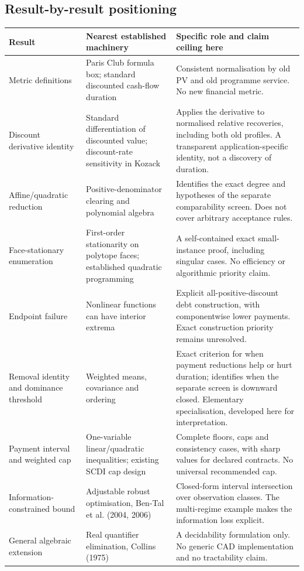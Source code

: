 \documentclass[11pt,a4paper]{article}
\begin{document}
\subsection{Result-by-result positioning}
\small
\begin{longtable}{p{}p{}p{}}
\toprule Result & Nearest established machinery & Specific role and claim ceiling here\\\midrule\endhead
Metric definitions & Paris Club formula box; standard discounted cash-flow duration & Consistent normalisation by old PV and old programme service. No new financial metric.\\
Discount derivative identity & Standard differentiation of discounted value; discount-rate sensitivity in Kozack & Applies the derivative to normalised relative recoveries, including both old profiles. A transparent application-specific identity, not a discovery of duration.\\
Affine/quadratic reduction & Positive-denominator clearing and polynomial algebra & Identifies the exact degree and hypotheses of the separate comparability screen. Does not cover arbitrary acceptance rules.\\
Face-stationary enumeration & First-order stationarity on polytope faces; established quadratic programming & A self-contained exact small-instance proof, including singular cases. No efficiency or algorithmic priority claim.\\
Endpoint failure & Nonlinear functions can have interior extrema & Explicit all-positive-discount debt construction, with componentwise lower payments. Exact construction priority remains unresolved.\\
Removal identity and dominance threshold & Weighted means, covariance and ordering & Exact criterion for when payment reductions help or hurt duration; identifies when the separate screen is downward closed. Elementary specialisation, developed here for interpretation.\\
Payment interval and weighted cap & One-variable linear/quadratic inequalities; existing SCDI cap design & Complete floors, caps and consistency cases, with sharp values for declared contracts. No universal recommended cap.\\
Information-constrained bound & Adjustable robust optimisation, Ben-Tal et al. (2004, 2006) & Closed-form interval intersection over observation classes. The multi-regime example makes the information loss explicit.\\
General algebraic extension & Real quantifier elimination, Collins (1975) & A decidability formulation only. No generic CAD implementation and no tractability claim.\\
\bottomrule
\end{longtable}
\normalsize
\end{document}
